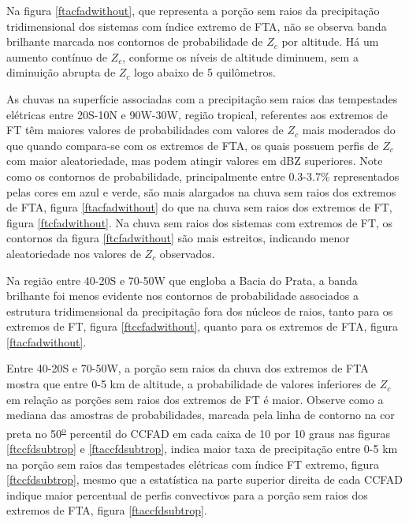 Na figura \ref{ftacfadwithout}, que representa a porção sem raios da precipitação tridimensional dos sistemas com índice extremo de FTA, não se observa banda brilhante marcada nos contornos de probabilidade de $Z_c$ por altitude. Há um aumento contínuo de $Z_c$,  conforme os níveis de altitude diminuem, sem a diminuição abrupta de $Z_c$ logo abaixo de 5 quilômetros.   


As chuvas na superfície associadas com a precipitação sem raios das tempestades elétricas entre 20S-10N e 90W-30W, região tropical, referentes aos extremos de FT têm maiores valores de probabilidades com valores de $Z_c$ mais moderados do que quando compara-se com os extremos de FTA, os quais possuem perfis de $Z_c$ com maior aleatoriedade, mas podem atingir valores em dBZ superiores. Note como os contornos de probabilidade, principalmente entre 0.3-3.7\% representados pelas cores em azul e verde, são mais alargados na chuva sem raios dos extremos de FTA, figura \ref{ftacfadwithout} do que na chuva sem raios dos extremos de FT, figura \ref{ftcfadwithout}. Na chuva sem raios dos sistemas com extremos de FT, os contornos da figura \ref{ftcfadwithout} são mais estreitos, indicando menor aleatoriedade nos valores de $Z_c$ observados.

Na região entre 40-20S e 70-50W que engloba a Bacia do Prata, a banda brilhante foi menos evidente nos contornos de probabilidade associados a estrutura tridimensional da precipitação fora dos núcleos de raios, tanto para os extremos de FT, figura \ref{ftccfadwithout}, quanto para os extremos de FTA, figura \ref{ftacfadwithout}. 

Entre 40-20S e 70-50W, a porção sem raios da chuva dos extremos de FTA mostra que entre 0-5 km de altitude, a probabilidade de valores inferiores de $Z_c$ em relação as porções sem raios dos extremos de FT é maior. Observe como a mediana das amostras de probabilidades, marcada pela linha de contorno na cor preta no 50\textsuperscript{\underline{o}} percentil do CCFAD em cada caixa de 10 por 10 graus nas figuras \ref{ftccfdsubtrop} e \ref{ftaccfdsubtrop}, indica maior taxa de precipitação entre 0-5 km na porção sem raios das tempestades elétricas com índice FT extremo, figura \ref{ftccfdsubtrop}, mesmo que a estatística na parte superior direita de cada CCFAD indique maior percentual de perfis convectivos para a porção sem raios dos extremos de FTA, figura \ref{ftaccfdsubtrop}.


